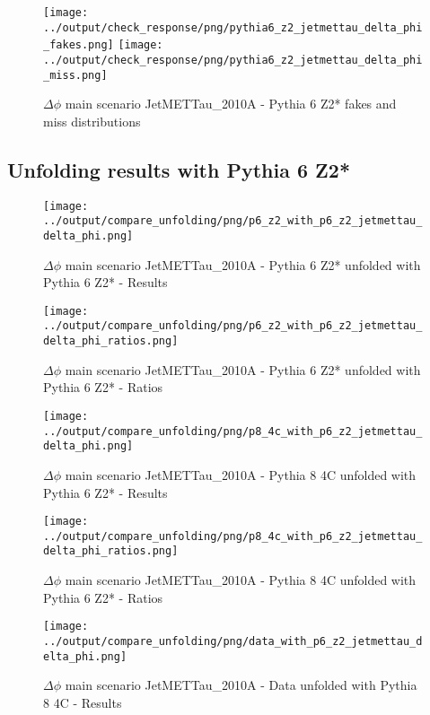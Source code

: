 \documentclass[11pt]{book}
\begin{document}
\begin{figure}[ht]
\centering
\texttt{[image: ../output/check\_response/png/pythia6\_z2\_jetmettau\_delta\_phi\_fakes.png]}
\texttt{[image: ../output/check\_response/png/pythia6\_z2\_jetmettau\_delta\_phi\_miss.png]}
\caption{$\Delta\phi$ main scenario JetMETTau\_2010A - Pythia 6 Z2* fakes and miss distributions}
\label{p6_jetmettau_delta_phi_fakesmiss}
\end{figure}

\clearpage
\subsection{Unfolding results with Pythia 6 Z2*}


\begin{figure}[ht]
\centering
\texttt{[image: ../output/compare\_unfolding/png/p6\_z2\_with\_p6\_z2\_jetmettau\_delta\_phi.png]}
\caption{$\Delta\phi$ main scenario JetMETTau\_2010A - Pythia 6 Z2* unfolded with Pythia 6 Z2* - Results}
\label{p6_p6_jetmettau_delta_phi_a}
\end{figure}

\begin{figure}[ht]
\centering
\texttt{[image: ../output/compare\_unfolding/png/p6\_z2\_with\_p6\_z2\_jetmettau\_delta\_phi\_ratios.png]}
\caption{$\Delta\phi$ main scenario JetMETTau\_2010A - Pythia 6 Z2* unfolded with Pythia 6 Z2* - Ratios}
\label{p6_p6_jetmettau_delta_phi_b}
\end{figure}

\begin{figure}[ht]
\centering
\texttt{[image: ../output/compare\_unfolding/png/p8\_4c\_with\_p6\_z2\_jetmettau\_delta\_phi.png]}
\caption{$\Delta\phi$ main scenario JetMETTau\_2010A - Pythia 8 4C unfolded with Pythia 6 Z2* - Results}
\label{p8_p6_jetmettau_delta_phi_a}
\end{figure}

\begin{figure}[ht]
\centering
\texttt{[image: ../output/compare\_unfolding/png/p8\_4c\_with\_p6\_z2\_jetmettau\_delta\_phi\_ratios.png]}
\caption{$\Delta\phi$ main scenario JetMETTau\_2010A - Pythia 8 4C unfolded with Pythia 6 Z2* - Ratios}
\label{p8_p6_jetmettau_delta_phi_b}
\end{figure}

\begin{figure}[ht]
\centering
\texttt{[image: ../output/compare\_unfolding/png/data\_with\_p6\_z2\_jetmettau\_delta\_phi.png]}
\caption{$\Delta\phi$ main scenario JetMETTau\_2010A - Data unfolded with Pythia 8 4C - Results}
\label{data_p6_jetmettau_delta_phi_a}
\end{figure}
\end{document}
